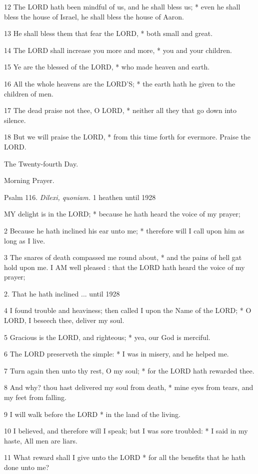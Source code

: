 12 The LORD hath been mindful of us, and he shall bless
us; * even he shall bless the house of Israel, he shall bless the house
of Aaron.

13 He shall bless them that fear the LORD, * both small
and great.

14 The LORD shall increase you more and more, * you
and your children.

15 Ye are the blessed of the LORD, * who made heaven
and earth.

16 All the whole heavens are the LORD’S; * the earth hath he given to the children of men.

17 The dead praise not thee, O LORD, * neither all
they that go down into silence.

18 But we will praise the LORD, * from this time forth
for evermore. Praise the LORD. 

The
Twenty-fourth Day.

Morning
Prayer.

Psalm
116. \emph{Dilexi, quoniam.} 1 heathen until
1928

MY
delight is in the LORD; * because he hath heard the voice of my prayer;

2 Because he hath inclined his ear unto me; * therefore
will I call upon him as long as I live.

3 The snares of death compassed me round about, * and
the pains of hell gat hold upon me. I AM well pleased
: that the LORD hath heard the voice of my prayer;

2. That he hath inclined ... until
1928

4 I found trouble and heaviness; then called I upon the Name of the LORD;
* O LORD, I beseech thee, deliver my soul.

5 Gracious is the LORD, and righteous; * yea, our God
is merciful.

6 The LORD preserveth the simple: * I was in misery,
and he helped me.

7 Turn again then unto thy rest, O my soul; * for the
LORD hath rewarded thee.

8 And why? thou hast delivered my soul from death, *
mine eyes from tears, and my feet from falling.

9 I will walk before the LORD * in the land of the living.

10 I believed, and therefore will I speak; but I was
sore troubled: * I said in my haste, All men are liars.

11 What reward shall I give unto the LORD * for all the
benefits that he hath done unto me?

